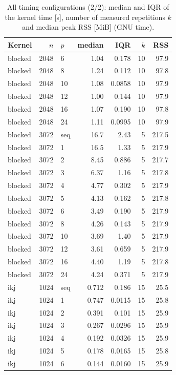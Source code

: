 \begin{table}[!ht]
\centering
\caption{All timing configurations (2/2): median and IQR of the kernel time [s], number of measured repetitions $k$ and median peak RSS [MiB] (GNU time).}
\label{tab:full2}
\scriptsize
\setlength{\tabcolsep}{3pt}
\begin{tabular}{@{}lrlrrrr@{}}
\toprule
Kernel & $n$ & $p$ & median & IQR & $k$ & RSS \\
\midrule
blocked & 2048 & 6 & 1.04 & 0.178 & 10 & 97.9 \\
blocked & 2048 & 8 & 1.24 & 0.112 & 10 & 97.8 \\
blocked & 2048 & 10 & 1.08 & 0.0858 & 10 & 97.9 \\
blocked & 2048 & 12 & 1.00 & 0.144 & 10 & 97.9 \\
blocked & 2048 & 16 & 1.07 & 0.190 & 10 & 97.8 \\
blocked & 2048 & 24 & 1.11 & 0.0995 & 10 & 97.9 \\
blocked & 3072 & seq & 16.7 & 2.43 & 5 & 217.5 \\
blocked & 3072 & 1 & 16.5 & 1.33 & 5 & 217.9 \\
blocked & 3072 & 2 & 8.45 & 0.886 & 5 & 217.7 \\
blocked & 3072 & 3 & 6.37 & 1.16 & 5 & 217.8 \\
blocked & 3072 & 4 & 4.77 & 0.302 & 5 & 217.9 \\
blocked & 3072 & 5 & 4.13 & 0.162 & 5 & 217.8 \\
blocked & 3072 & 6 & 3.49 & 0.190 & 5 & 217.9 \\
blocked & 3072 & 8 & 4.26 & 0.143 & 5 & 217.9 \\
blocked & 3072 & 10 & 3.69 & 1.40 & 5 & 217.9 \\
blocked & 3072 & 12 & 3.61 & 0.659 & 5 & 217.9 \\
blocked & 3072 & 16 & 4.40 & 1.19 & 5 & 217.8 \\
blocked & 3072 & 24 & 4.24 & 0.371 & 5 & 217.9 \\
ikj & 1024 & seq & 0.712 & 0.186 & 15 & 25.5 \\
ikj & 1024 & 1 & 0.747 & 0.0115 & 15 & 25.8 \\
ikj & 1024 & 2 & 0.391 & 0.101 & 15 & 25.9 \\
ikj & 1024 & 3 & 0.267 & 0.0296 & 15 & 25.9 \\
ikj & 1024 & 4 & 0.192 & 0.0326 & 15 & 25.9 \\
ikj & 1024 & 5 & 0.178 & 0.0165 & 15 & 25.8 \\
ikj & 1024 & 6 & 0.144 & 0.0160 & 15 & 25.9 \\

\end{tabular}
\end{table}
